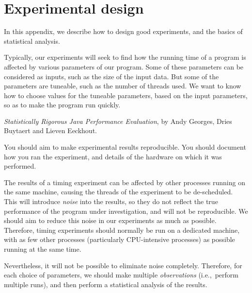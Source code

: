 \chapter{Experimental design}
\label{app:experiments}

In this appendix, we describe how to design good experiments, and the basics
of statistical analysis.  

Typically, our experiments will seek to find how the running time of a program
is affected by various parameters of our program.  Some of these parameters
can be considered as inputs, such as the size of the input data.  But some of
the parameters are tuneable, such as the number of threads used.  We want to
know how to choose values for the tuneable parameters, based on the input
parameters, so as to make the program run quickly. 

 \emph{Statistically Rigorous Java Performance Evaluation}, by
Andy Georges, Dries Buytaert and Lieven Eeckhout.

You should aim to make experimental results reproducible.  You should document
how you ran the experiment, and details of the hardware on which it was
performed.

The results of a timing experiment can be affected by other processes
running on the same machine, causing the threads of the experiment to be
de-scheduled.  This will introduce \emph{noise} into the results, so they do
not reflect the true performance of the program under investigation, and will
not be reproducible.
%
We should aim to reduce this noise in our experiments as much as possible.
Therefore, timing experiments should normally be run on a dedicated machine,
with as few other processes (particularly CPU-intensive processes) as possible
running at the same time.

Nevertheless, it will not be possible to eliminate noise completely.
Therefore, for each choice of parameters, we should make multiple
\emph{observations} (i.e.,~perform multiple runs), and then perform a
statistical analysis of the results.

